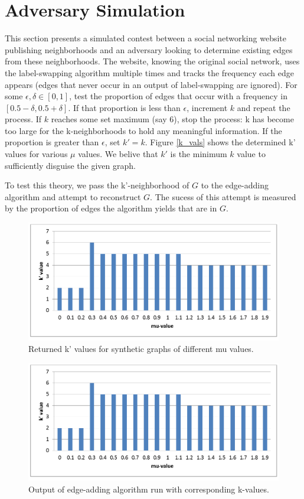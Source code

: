 \section{Adversary Simulation}

\noindent This section presents a simulated contest between a social networking website publishing neighborhoods and an adversary looking to determine existing edges from these neighborhoods. The website, knowing the original social network, uses the label-swapping algorithm multiple times and tracks the frequency each edge appears (edges that never occur in an output of label-swapping are ignored). For some $\epsilon,\delta \in [0,1]$, test the proportion of edges that occur with a frequency in $[0.5-\delta,0.5+\delta]$. If that proportion is less than $\epsilon$, increment $k$ and repeat the process. If $k$ reaches some set maximum (say 6), stop the process: k has become too large for the k-neighborhoods to hold any meaningful information. If the proportion is greater than $\epsilon$, set $k' = k$.  Figure \ref{k_vals} shows the determined k' values for various $\mu$ values. We belive that $k'$ is the minimum $k$ value to sufficiently disguise the given graph.

\indent To test this theory, we pass the k'-neighborhood of $G$ to the edge-adding algorithm and attempt to reconstruct $G$. The sucess of this attempt is measured by the proportion of edges the algorithm yields that are in $G$.

\begin{figure}[ht]
  \label{k_vals}
  \centering
  \includegraphics[scale=0.4]{k'_value_synthetic.png}
  \caption{Returned k' values for synthetic graphs of different mu values.}
  \label{fig:k'_values}
\end{figure}

\begin{figure}[ht]
  \label{profs_out}
  \centering
  \includegraphics[scale=0.4]{k'_value_synthetic.png}
  \caption{Output of edge-adding algorithm run with corresponding k-values.}
  \label{fig:prof_values}
\end{figure}